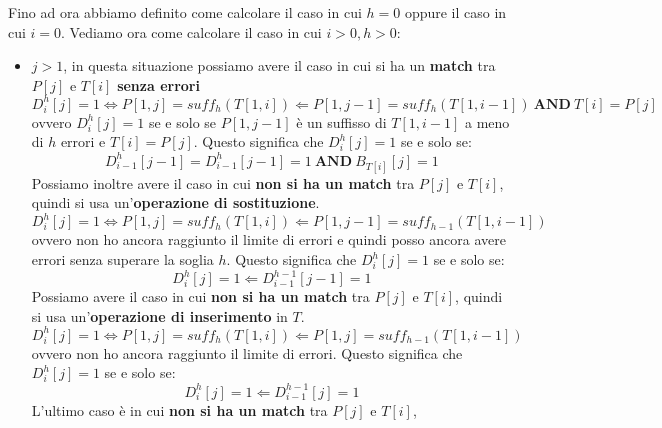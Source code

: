 Fino ad ora abbiamo definito come calcolare il caso in cui $h = 0$ oppure il caso
in cui $i = 0$. Vediamo ora come calcolare il caso in cui $i > 0, h > 0$:
\begin{itemize}
    \item $j > 1$, in questa situazione possiamo avere il caso in cui si ha un \textbf{match}
          tra $P[j]$ e $T[i]$  \textbf{senza errori}
          \begin{equation}
              D_i^h[j] = 1 \iff P[1, j] =suff_h(T[1, i]) \Leftarrow P[1, j - 1] = suff_h(T[1, i - 1]) \  \textbf{AND} \ T[i] = P[j]
          \end{equation}
          ovvero $D_i^h[j] = 1$ se e solo se $P[1, j - 1]$ è un suffisso di $T[1, i - 1]$
          a meno di $h$ errori e $T[i] = P[j]$. Questo significa che $D_i^h[j] = 1$ se e solo se:
          \begin{equation}
              D_{i - 1}^h[j - 1] = D_{i - 1}^h [j - 1] = 1 \ \textbf{AND} \ B_{T[i]} [j] =  1
          \end{equation}
          Possiamo inoltre avere il caso  in cui \textbf{non si ha un match} tra $P[j]$ e $T[i]$,
          quindi si usa un'\textbf{operazione di sostituzione}.
          \begin{equation}
              D_i^h[j] = 1 \iff P[1, j] =suff_h(T[1, i]) \Leftarrow P[1, j - 1] = suff_{h - 1}(T[1, i - 1])
          \end{equation}
          ovvero non ho ancora raggiunto il limite di errori e quindi posso ancora avere
          errori senza superare la soglia $h$. Questo significa che $D_i^h[j] = 1$ se e solo se:
          \begin{equation}
              D_i^h[j] = 1 \Leftarrow D_{i - 1}^{h - 1} [j - 1] = 1
          \end{equation}
          Possiamo avere il caso in cui \textbf{non si ha un match} tra $P[j]$ e $T[i]$,
          quindi si usa un'\textbf{operazione di inserimento} in $T$.
          \begin{equation}
              D_i^h[j] = 1 \iff P[1, j] =suff_h(T[1, i]) \Leftarrow P[1, j] = suff_{h - 1}(T[1, i - 1])
          \end{equation}
          ovvero non ho ancora raggiunto il limite di errori. Questo significa che $D_i^h[j] = 1$
          se e solo se:
          \begin{equation}
              D_i^h[j] = 1 \Leftarrow D_{i - 1}^{h - 1} [j] = 1
          \end{equation}
          L'ultimo caso è in cui \textbf{non si ha un match} tra $P[j]$ e $T[i]$,

\end{itemize}

